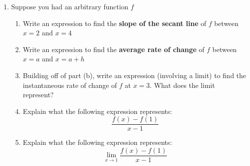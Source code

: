 \documentclass[10pt]{article}
\begin{document}
{\begin{enumerate}
\newpage
\item[4.] Suppose you had an arbitrary function $f$
\begin{enumerate}
    \item[(a)] Write an expression to find the \textbf{slope of the secant line} of $f$ between $x = 2$ and $x = 4$
        \vfill
    \item[(b)] Write an expression to find the \textbf{average rate of change} of $f$ between $x = a$ and $x = a+h$
        \vfill
    \item[(c)] Building off of part (b), write an expression (involving a limit) to find the instantaneous rate of change of $f$ at $x = 3$. What does the limit represent?
        \vfill
    \item[(d)] Explain what the following expression represents:
    \[\frac{f(x) - f(1)}{x - 1}\]
        \vfill
    \item[(e)] Explain what the following expression represents:
    \[\lim_{x \to 1}\frac{f(x) - f(1)}{x - 1}\]
        \vfill

    
    \end{enumerate}

\end{enumerate}

}
\end{document}
